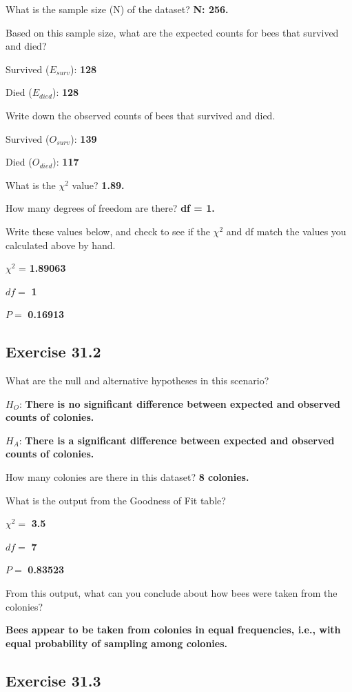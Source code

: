 \documentclass[
  openany]{krantz}
\begin{document}
What is the sample size (N) of the dataset? \textbf{N: 256.}

Based on this sample size, what are the expected counts for bees that survived and died?

Survived (\(E_{surv}\)): \textbf{128}

Died (\(E_{died}\)): \textbf{128}

Write down the observed counts of bees that survived and died.

Survived (\(O_{surv}\)): \textbf{139}

Died (\(O_{died}\)): \textbf{117}

What is the \(\chi^{2}\) value? \textbf{1.89.}

How many degrees of freedom are there? \textbf{df = 1.}

Write these values below, and check to see if the \(\chi^{2}\) and df match the values you calculated above by hand.

\(\chi^{2}\) = \textbf{1.89063}

\(df =\) \textbf{1}

\(P =\) \textbf{0.16913}

\hypertarget{exercise-31.2}{%
\subsection{Exercise 31.2}\label{exercise-31.2}}

What are the null and alternative hypotheses in this scenario?

\(H_{O}\): \textbf{There is no significant difference between expected and}
\textbf{observed counts of colonies.}

\(H_{A}\): \textbf{There is a significant difference between expected and observed counts of colonies.}

How many colonies are there in this dataset? \textbf{8 colonies.}

What is the output from the Goodness of Fit table?

\(\chi^{2} =\) \textbf{3.5}

\(df =\) \textbf{7}

\(P =\) \textbf{0.83523}

From this output, what can you conclude about how bees were taken from the colonies?

\textbf{Bees appear to be taken from colonies in equal frequencies, i.e., with equal probability of sampling among colonies.}

\hypertarget{exercise-31.3}{%
\subsection{Exercise 31.3}\label{exercise-31.3}}
\end{document}
